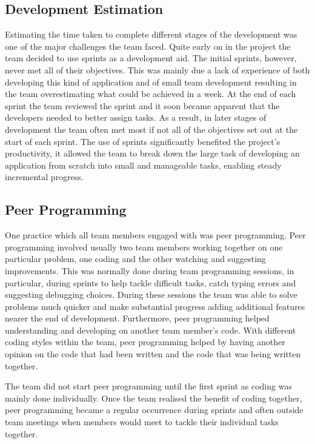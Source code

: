 \documentclass{l3proj}
\begin{document}
\subsection{Development Estimation}
Estimating the time taken to complete different stages of the development was one of the major challenges the team faced. Quite early on in the project the team decided to use sprints as a development aid. The initial sprints, however, never met all of their objectives. This was mainly due a lack of experience of  both developing this kind of application and of small team development resulting in the team overestimating what could be achieved in a week. At the end of each sprint the team reviewed the sprint and it soon became apparent that the developers needed to better assign tasks. As a result, in later stages of development the team often met most if not all of the objectives set out at the start of each sprint. The use of sprints significantly benefited the project's productivity, it allowed the team to break down the large task of developing an application from scratch into small and manageable tasks, enabling steady incremental progress.

\subsection{Peer Programming}
One practice which all team members engaged with was peer programming. Peer programming involved usually two team members working together on one particular problem, one coding and the other watching and suggesting improvements. This was normally done during team programming sessions, in particular, during sprints to help tackle difficult tasks, catch typing errors and suggesting debugging choices. During these sessions the team was able to solve problems much quicker and make substantial progress adding additional features nearer the end of development. Furthermore, peer programming helped understanding and developing on another team member's code. With different coding styles within the team, peer programming helped by having another opinion on the code that had been written and the code that was being written together. 

The team did not start peer programming until the first sprint as coding was mainly done individually. Once the team realised the benefit of coding together, peer programming became a regular occurrence during sprints and often outside team meetings when members would meet to tackle their individual tasks together.
\end{document}
